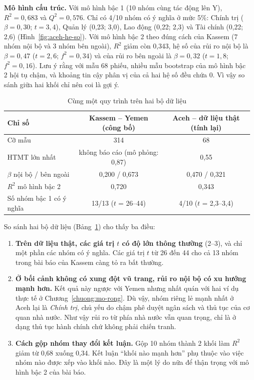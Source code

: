\textbf{Mô hình cấu trúc.} Với mô hình bậc 1 (10 nhóm cùng tác động lên Y), $R^2 = 0{,}683$ và $Q^2 = 0{,}576$. Chỉ có 4/10 nhóm có ý nghĩa ở mức 5\%: Chính trị ($\beta = 0{,}30$; $t = 3{,}4$), Quản lý (0,23; 3,0), Lao động (0,22; 2,3) và Tài chính (0,22; 2,6) (Hình~\ref{fig:aceh-he-so}). Với mô hình bậc 2 theo đúng cách của Kassem (7 nhóm nội bộ và 3 nhóm bên ngoài), $R^2$ giảm còn 0,343, hệ số của rủi ro nội bộ là $\beta = 0{,}47$ ($t = 2{,}6$; $f^2 = 0{,}34$) và của rủi ro bên ngoài là $\beta = 0{,}32$ ($t = 1{,}8$; $f^2 = 0{,}16$). Lưu ý rằng với mẫu 68 phiếu, nhiều mẫu bootstrap của mô hình bậc 2 hội tụ chậm, và khoảng tin cậy phân vị của cả hai hệ số đều chứa 0. Vì vậy so sánh giữa hai khối chỉ nên coi là gợi ý.

\begin{table}[H]
\centering
\caption{Cùng một quy trình trên hai bộ dữ liệu}
\label{tab:aceh-kassem}
\begin{tabular}{@{}lcc@{}}
\toprule
\textbf{Chỉ số} & \textbf{Kassem -- Yemen (công bố)} & \textbf{Aceh -- dữ liệu thật (tính lại)} \\
\midrule
Cỡ mẫu & 314 & 68 \\
HTMT lớn nhất & không báo cáo (mô phỏng: 0,87) & 0,55 \\
$\beta$ nội bộ / bên ngoài & 0,200 / 0,673 & 0,470 / 0,321 \\
$R^2$ mô hình bậc 2 & 0,720 & 0,343 \\
Số nhóm bậc 1 có ý nghĩa & 13/13 ($t$ = 26--44) & 4/10 ($t$ = 2,3--3,4) \\
\bottomrule
\end{tabular}
\end{table}

So sánh hai bộ dữ liệu (Bảng~\ref{tab:aceh-kassem}) cho thấy ba điều:
\begin{enumerate}
  \item \textbf{Trên dữ liệu thật, các giá trị $t$ có độ lớn thông thường} (2--3), và chỉ một phần các nhóm có ý nghĩa. Các giá trị $t$ từ 26 đến 44 cho cả 13 nhóm trong bài báo của Kassem càng tỏ ra bất thường.
  \item \textbf{Ở bối cảnh không có xung đột vũ trang, rủi ro nội bộ có xu hướng mạnh hơn.} Kết quả này ngược với Yemen nhưng nhất quán với hai ví dụ thực tế ở Chương~\ref{chuong:mo-rong}. Dù vậy, nhóm riêng lẻ mạnh nhất ở Aceh lại là \emph{Chính trị}, chủ yếu do chậm phê duyệt ngân sách và thủ tục của cơ quan nhà nước. Như vậy rủi ro từ phía nhà nước vẫn quan trọng, chỉ là ở dạng thủ tục hành chính chứ không phải chiến tranh.
  \item \textbf{Cách gộp nhóm thay đổi kết luận.} Gộp 10 nhóm thành 2 khối làm $R^2$ giảm từ 0,68 xuống 0,34. Kết luận ``khối nào mạnh hơn'' phụ thuộc vào việc nhóm nào được xếp vào khối nào. Đây là một lý do nữa để thận trọng với mô hình bậc 2 của bài báo.
\end{enumerate}

